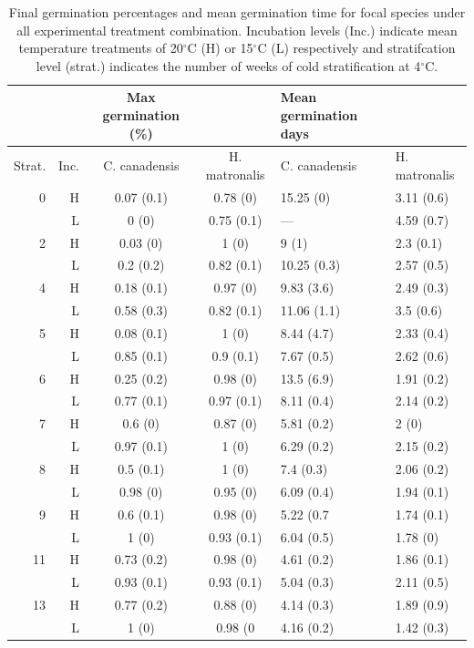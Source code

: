 \documentclass{article}
\begin{document}
\begin{table}[hp]
\centering
\begin{tabular}{|rr|cc|ll|}
   \hline
     & & Max germination (\%) & &
   Mean germination days & \\ 
  \hline
  Strat. & Inc.  & C. canadensis & H. matronalis & C. canadensis & H. matronalis \\ 
  \hline
0 & H & 0.07 (0.1) & 0.78 (0) & 15.25 (0) & 3.11 (0.6) \\ 
  & L & 0 (0) & 0.75 (0.1) & --- & 4.59 (0.7) \\ 
   \hline
 2 & H & 0.03 (0) & 1 (0) & 9 (1) & 2.3 (0.1) \\ 
  & L & 0.2 (0.2) & 0.82 (0.1) & 10.25 (0.3) & 2.57 (0.5) \\ 
   \hline
 4 & H & 0.18 (0.1) & 0.97 (0) & 9.83 (3.6) & 2.49 (0.3) \\ 
 & L & 0.58 (0.3) & 0.82 (0.1) & 11.06 (1.1) & 3.5 (0.6) \\ 
    \hline
    5 & H & 0.08 (0.1) & 1 (0) & 8.44 (4.7) & 2.33 (0.4) \\ 
 & L & 0.85 (0.1) & 0.9 (0.1) & 7.67 (0.5) & 2.62 (0.6) \\ 
   \hline
   6 & H & 0.25 (0.2) & 0.98 (0) & 13.5 (6.9) & 1.91 (0.2) \\ 
  & L & 0.77 (0.1) & 0.97 (0.1) & 8.11 (0.4) & 2.14 (0.2) \\ 
    \hline
    7 & H & 0.6 (0) & 0.87 (0) & 5.81 (0.2) & 2 (0) \\ 
 & L & 0.97 (0.1) & 1 (0) & 6.29 (0.2) & 2.15 (0.2) \\ 
    \hline
    8 & H & 0.5 (0.1) & 1 (0) & 7.4 (0.3) & 2.06 (0.2) \\ 
 & L & 0.98 (0) & 0.95 (0) & 6.09 (0.4) & 1.94 (0.1) \\ 
      \hline
   9 & H & 0.6 (0.1) & 0.98 (0) & 5.22 (0.7 & 1.74 (0.1) \\ 
 & L & 1 (0) & 0.93 (0.1) & 6.04 (0.5) & 1.78 (0) \\ 
      \hline
   11 & H & 0.73 (0.2) & 0.98 (0) & 4.61 (0.2) & 1.86 (0.1) \\ 
 & L & 0.93 (0.1) & 0.93 (0.1) & 5.04 (0.3) & 2.11 (0.5) \\ 
      \hline
   13 & H & 0.77 (0.2) & 0.88 (0) & 4.14 (0.3) & 1.89 (0.9) \\ 
 & L & 1 (0) & 0.98 (0 & 4.16 (0.2) & 1.42 (0.3) \\ 
   \hline
\end{tabular}
\caption{Final germination percentages and mean germination time for focal species under all experimental treatment combination. Incubation levels (Inc.) indicate mean temperature treatments of 20$^\circ$C (H) or 15$^\circ$C (L) respectively and stratifcation level (strat.) indicates the number of weeks of cold stratification at 4$^\circ$C.}
\label{tab:germcomps}
\end{table}
\end{document}
